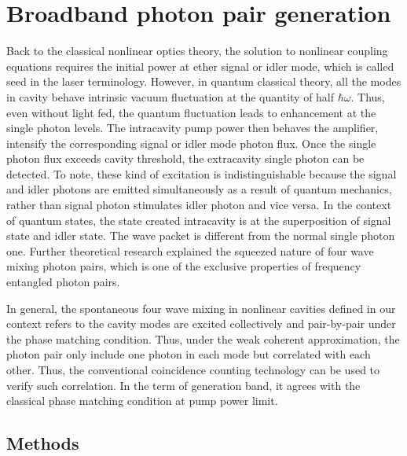 \chapter{Broadband photon pair generation}

Back to the classical nonlinear optics theory, the solution to nonlinear coupling equations requires the initial power at ether signal or idler mode, which is called seed in the laser terminology. However, in quantum classical theory, all the modes in cavity behave intrinsic vacuum fluctuation at the quantity of half $ \hbar \omega $. Thus, even without light fed, the quantum fluctuation leads to enhancement at the single photon levels. The intracavity pump power then behaves the amplifier, intensify the corresponding signal or idler mode photon flux. Once the single photon flux exceeds cavity threshold, the extracavity single photon can be detected. To note, these kind of excitation is indistinguishable because the signal and idler photons are emitted simultaneously as a result of quantum mechanics, rather than signal photon stimulates idler photon and vice versa. In the context of quantum states, the state created intracavity is at the superposition of signal state and idler state. The wave packet is different from the normal single photon one. Further theoretical research \cite{Scully1997} explained the squeezed nature of four wave mixing photon pairs, which is one of the exclusive properties of frequency entangled photon pairs.

In general, the spontaneous four wave mixing in nonlinear cavities defined in our context refers to the cavity modes are excited collectively and pair-by-pair under the phase matching condition. Thus, under the weak coherent approximation, the photon pair only include one photon in each mode but correlated with each other. Thus, the conventional coincidence counting technology can be used to verify such correlation. In the term of generation band, it agrees with the classical phase matching condition at pump power limit.


\section{Methods}

